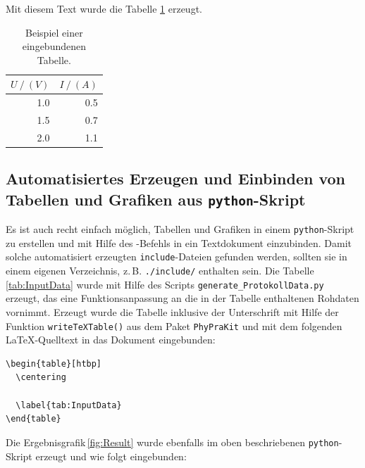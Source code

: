 \documentclass[a4paper,10pt]{article}
\begin{document}
Mit diesem Text wurde die Tabelle \ref{tab:tabelle1} erzeugt.  
\begin{table}[htbp]
  \centering
     \begin{tabular}{rr}
	\toprule
	$U ~/~ (V)$ & $I ~/~ (A)$\\
	\midrule
         1.0 & 0.5 \\
         1.5 & 0.7 \\
         2.0 & 1.1 \\
	\bottomrule
      \end{tabular}
    \caption{Beispiel einer eingebundenen Tabelle.}
    \label{tab:tabelle1}
\end{table}

\newpage

\subsection{Automatisiertes Erzeugen und Einbinden von Tabellen und Grafiken aus \texttt{python}-Skript}

Es ist auch recht einfach möglich, Tabellen und Grafiken
in einem \verb|python|-Skript zu erstellen und mit Hilfe des
\verb||-Befehls in ein Textdokument einzubinden.
Damit solche automatisiert erzeugten \texttt{include}-Dateien
gefunden werden, sollten sie in einem eigenen Verzeichnis,
z.\,B. \texttt{./include/} enthalten sein.
Die Tabelle\,\ref{tab:InputData} wurde mit Hilfe des Scripts
\verb|generate_ProtokollData.py| erzeugt, das eine Funktionsanpassung
an die in der Tabelle enthaltenen Rohdaten vornimmt. 
Erzeugt wurde die Tabelle inklusive der Unterschrift mit Hilfe der
Funktion \verb|writeTeXTable()| aus dem Paket \verb|PhyPraKit|
und mit dem folgenden \LaTeX-Quelltext in das Dokument eingebunden:

\begin{verbatim}
\begin{table}[htbp]
  \centering
  
  \label{tab:InputData}
\end{table}
\end{verbatim}

\begin{table}[htbp]
  \centering
  
  \label{tab:InputData}
\end{table}

Die Ergebnisgrafik\,\ref{fig:Result} wurde ebenfalls im oben beschriebenen
\texttt{python}-Skript erzeugt und wie folgt eingebunden:
\end{document}
